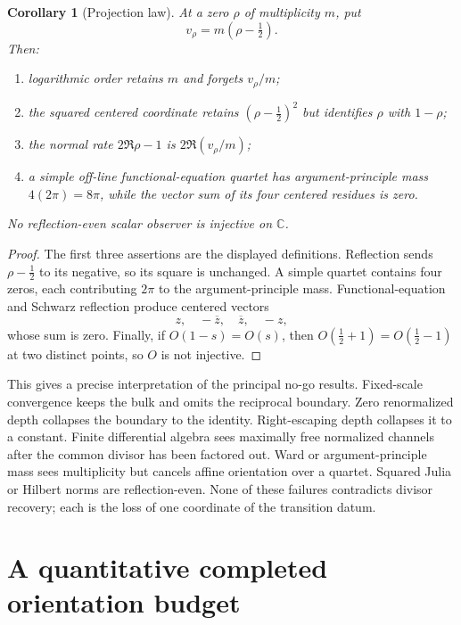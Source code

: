 \documentclass[11pt]{article}
\newtheorem{corollary}[theorem]{Corollary}
\theoremstyle{definition}
\theoremstyle{remark}
\newcommand{\C}{\mathbb C}
\begin{document}
\begin{corollary}[Projection law]\label{cor:projection-law}
At a zero \(\rho\) of multiplicity \(m\), put
\[
 v_\rho=m(\rho-\tfrac12).
 \tag{8.7}
\]
Then:
\begin{enumerate}[label=\textup{(\roman*)}]
\item logarithmic order retains \(m\) and forgets \(v_\rho/m\);
\item the squared centered coordinate retains
\((\rho-\tfrac12)^2\) but identifies \(\rho\) with \(1-\rho\);
\item the normal rate \(2\Re\rho-1\) is \(2\Re(v_\rho/m)\);
\item a simple off-line functional-equation quartet has argument-principle mass
\(4(2\pi)=8\pi\), while the vector sum of its four centered residues is zero.
\end{enumerate}
No reflection-even scalar observer is injective on \(\C\).
\end{corollary}

\begin{proof}
The first three assertions are the displayed definitions.  Reflection sends
\(\rho-\tfrac12\) to its negative, so its square is unchanged.  A simple quartet contains four
zeros, each contributing \(2\pi\) to the argument-principle mass.  Functional-equation and
Schwarz reflection produce centered vectors
\[
 z,\quad-\overline z,\quad\overline z,\quad-z,
 \tag{8.8}
\]
whose sum is zero.  Finally, if \(O(1-s)=O(s)\), then
\(O(\tfrac12+1)=O(\tfrac12-1)\) at two distinct points, so \(O\) is not injective.
\end{proof}

This gives a precise interpretation of the principal no-go results.  Fixed-scale convergence
keeps the bulk and omits the reciprocal boundary.  Zero renormalized depth collapses the
boundary to the identity.  Right-escaping depth collapses it to a constant.  Finite
differential algebra sees maximally free normalized channels after the common divisor has been
factored out.  Ward or argument-principle mass sees multiplicity but cancels affine orientation
over a quartet.  Squared Julia or Hilbert norms are reflection-even.  None of these failures
contradicts divisor recovery; each is the loss of one coordinate of the transition datum.

\section{A quantitative completed orientation budget}\label{sec:orientation-budget}
\end{document}

